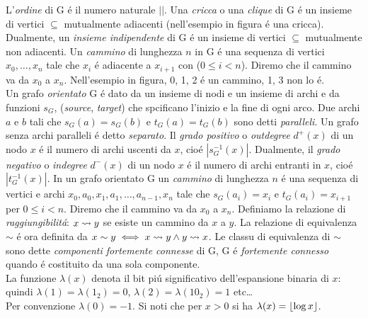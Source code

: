 \noindent L'\textit{ordine} di G é il numero naturale $|$$|$. Una \textit{cricca} o una \textit{clique} di G é un insieme di vertici  $\subseteq$  mutualmente adiacenti (nell'esempio in figura  é una cricca). Dualmente, un \textit{insieme indipendente} di G é un insieme di vertici  $\subseteq$  mutualmente non adiacenti. Un \textit{cammino} di lunghezza $n$ in G é una sequenza di vertici $x_0, \dots, x_{n}$ tale che $x_i$ é adiacente a $x_{i + 1}$ con ($0 \leq i < n$). Diremo che il cammino va da $x_0$ a $x_{n}$. Nell'esempio in figura, 0, 1, 2 é un cammino, 1, 3 non lo é.\\
Un grafo \textit{orientato} G é dato da un insieme di nodi  e un insieme di archi  e da funzioni $s_G$,  (\textit{source}, \textit{target}) che spcificano l'inizio e la fine di ogni arco. Due archi $a$ e $b$ tali che $s_G(a) = s_G(b)$ e $t_G(a) = t_G(b)$ sono detti \textit{paralleli}. Un grafo senza archi paralleli é detto \textit{separato}. Il \textit{grado positivo} o \textit{outdegree} $d^+(x)$ di un nodo $x$ é il numero di archi uscenti da $x$, cioé $|s_G^{-1}(x)|$. Dualmente, il \textit{grado negativo} o \textit{indegree} $d^-(x)$ di un nodo $x$ é il numero di archi entranti in $x$, cioé $|t_G^{-1}(x)|$. In un grafo orientato G un \textit{cammino} di lunghezza $n$ é una sequenza di vertici e archi $x_0, a_0, x_1, a_1, \dots, a_{n - 1}, x_n$ tale che $s_G(a_i) = x_i$ e $t_G(a_i) = x_{i + 1}$ per $0 \leq i < n$. Diremo che il cammino va da $x_0$ a $x_n$.
Definiamo la relazione di \textit{raggiungibilitá}: $x \mathrel{\leadsto} y$ se esiste un cammino da $x$ a $y$. La relazione di equivalenza $\sim$ é ora definita da $x \sim y \iff x \mathrel{\leadsto} y \land y \mathrel{\leadsto} x$. Le classu di equivalenza di $\sim$ sono dette \textit{componenti fortemente connesse} di G, G é \textit{fortemente connesso} quando é costituito da una sola componente.\\
La funzione $\lambda(x)$ denota il bit piú significativo dell'espansione binaria di $x$: quindi $\lambda(1) = \lambda(1_2) = 0$, $\lambda(2) = \lambda(10_2) = 1$ etc\dots\\
Per convenzione $\lambda(0) = -1$. Si noti che per $x > 0$ si ha $\lambda(x) = \lfloor \log{x} \rfloor$.